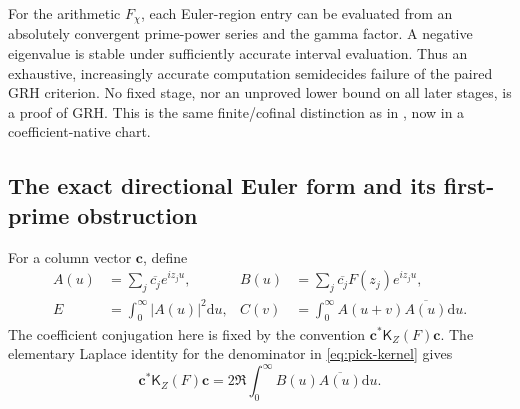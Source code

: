 \documentclass[11pt]{article}
\theoremstyle{definition}
\theoremstyle{remark}
\newcommand{\dd}{\mathrm d}
\begin{document}
For the arithmetic $F_\chi$, each Euler-region entry can be evaluated
from an absolutely convergent prime-power series and the gamma factor.
A negative eigenvalue is stable under sufficiently accurate interval
evaluation.  Thus an exhaustive, increasingly accurate computation
semidecides failure of the paired GRH criterion.  No fixed stage, nor
an unproved lower bound on all later stages, is a proof of GRH.  This
is the same finite/cofinal distinction as in
, now in a coefficient-native chart.

\subsection{The exact directional Euler form and its first-prime obstruction}
\label{subsec:pick-directional}

For a column vector $\boldsymbol c$, define
\begin{equation}
 \begin{aligned}
 A(u)&=\sum_j\overline{c_j}e^{iz_ju},&
 B(u)&=\sum_j\overline{c_j}F(z_j)e^{iz_ju},\\
 E&=\int_0^\infty|A(u)|^2\dd u,&
 C(v)&=\int_0^\infty A(u+v)\overline{A(u)}\dd u.
 \end{aligned}
 \label{eq:pick-directional-readers}
\end{equation}
The coefficient conjugation here is fixed by the convention
$\boldsymbol c^*\mathsf K_Z(F)\boldsymbol c$.
The elementary Laplace identity for the denominator in
\eqref{eq:pick-kernel} gives
\begin{equation}
 \boldsymbol c^*\mathsf K_Z(F)\boldsymbol c
 =2\Re\int_0^\infty B(u)\overline{A(u)}\dd u.
 \label{eq:pick-directional-identity}
\end{equation}
\end{document}
